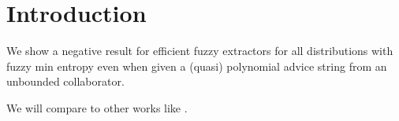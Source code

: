 \section{Introduction}
We show a negative result for efficient fuzzy extractors for all distributions with fuzzy min entropy even when given a (quasi) polynomial advice string from an unbounded collaborator. 

We will compare to other works like \cite{fuller2020fuzzy}. 